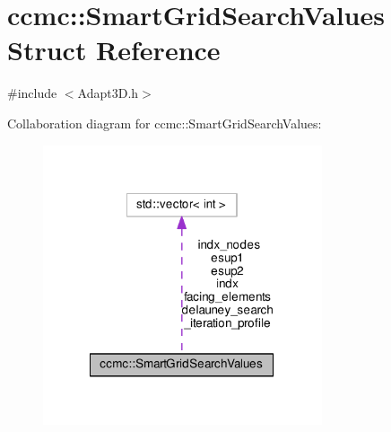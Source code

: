 \hypertarget{structccmc_1_1_smart_grid_search_values}{\section{ccmc\-:\-:Smart\-Grid\-Search\-Values Struct Reference}
\label{structccmc_1_1_smart_grid_search_values}
}


{\ttfamily \#include $<$Adapt3\-D.\-h$>$}



Collaboration diagram for ccmc\-:\-:Smart\-Grid\-Search\-Values\-:
\nopagebreak
\begin{figure}[H]
\begin{center}
\leavevmode
\includegraphics[width=233pt]{structccmc_1_1_smart_grid_search_values__coll__graph}
\end{center}
\end{figure}
